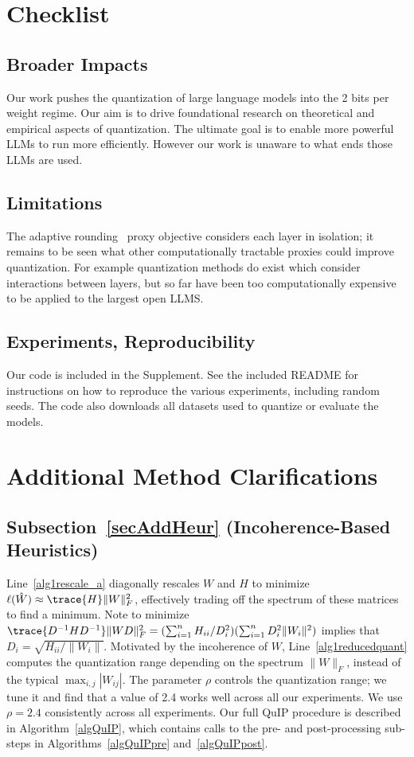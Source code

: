 
\section{Checklist}

\subsection{Broader Impacts}
Our work pushes the quantization of large language models into the 2 bits per weight regime.
Our aim is to drive foundational research on theoretical and empirical aspects of quantization.
The ultimate goal is to enable more powerful LLMs to run more efficiently.
However our work is unaware to what ends those LLMs are used.


\subsection{Limitations}
The adaptive rounding~\cite{nagel2020up} proxy objective considers each layer in isolation; it remains to be seen what other computationally tractable proxies could improve quantization.
For example quantization methods do exist which consider interactions between layers, but so far have been too computationally expensive to be applied to the largest open LLMS.


\subsection{Experiments, Reproducibility}
Our code is included in the Supplement.
See the included README for instructions on how to reproduce the various experiments, including random seeds.
The code also downloads all datasets used to quantize or evaluate the models.


\section{Additional Method Clarifications}\label{suppExtraMethod}
\subsection{Subsection~\ref{secAddHeur} (Incoherence-Based Heuristics)}
Line~\ref{alg1rescale_a} diagonally rescales $W$ and $H$ to minimize $\ell(\hat W) \approx \trace{H} \|W\|_F^2$, effectively trading off the spectrum of these matrices to find a minimum.
Note to minimize $\trace{ D^{-1} H D^{-1} } \|W D\|_F^2 = (\sum_{i=1}^n H_{ii} / D_i^2) (\sum_{i=1}^n D_i^2 \|W_i\|^2)$ implies that $D_i = \sqrt{H_{ii} / \|W_i\|}$.
Motivated by the incoherence of $W$, Line~\ref{alg1reducedquant} computes the quantization range depending on the spectrum $\|W\|_F$, instead of the typical $\max_{i,j} |W_{ij}|$.
The parameter $\rho$ controls the quantization range; we tune it and find that a value of 2.4 works well across all our experiments.
We use $\rho=2.4$ consistently across all experiments.
Our full QuIP procedure is described in Algorithm~\ref{algQuIP}, which contains calls to the pre- and post-processing sub-steps in Algorithms~\ref{algQuIPpre} and~\ref{algQuIPpost}.




